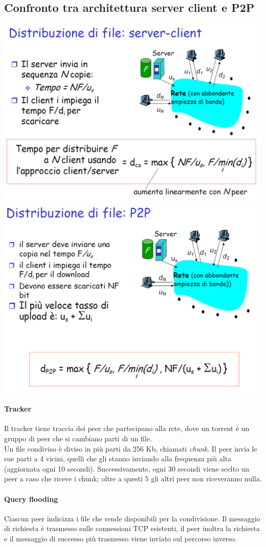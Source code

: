 \documentclass{report}
\begin{document}
	\subsection{Confronto tra architettura server client e P2P}
	\begin{center}
		\includegraphics[width=0.7\linewidth]{server-client.png}
		\medskip\\
		\includegraphics[width=0.7\linewidth]{p2p.png}
	\end{center}
	\paragraph{Tracker} Il tracker tiene traccia dei peer che partecipano alla rete, dove un torrent è un gruppo di peer che si cambiano parti di un file.
	\medskip\\Un file condiviso è diviso in più parti da 256 Kb, chiamati \textit{chunk}. Il peer invia le sue parti a 4 vicini, quelli che gli stanno inviando alla frequenza più alta (aggiornata ogni 10 secondi). Successivamente, ogni 30 secondi viene scelto un peer a caso che riceve i chunk; oltre a questi 5 gli altri peer non riceveranno nulla.
	\paragraph{Query flooding} Ciascun peer indicizza i file che rende disponibili per la condivisione. Il messaggio di richiesta è trasmesso sulle connessioni TCP esistenti, il peer inoltra la richiesta e il messaggio di successo più trasmesso viene inviato sul percorso inverso.
\end{document}
